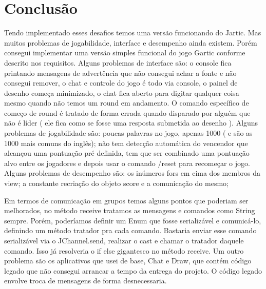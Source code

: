 \documentclass{article}
\begin{document}
\section{Conclusão}
Tendo implementado esses desafios temos uma versão funcionando do Jartic. Mas muitos problemas de jogabilidade, interface e desempenho ainda existem. Porém consegui implementar uma versão simples funcional do jogo Gartic conforme descrito nos requisitos. Alguns problemas de interface são: o console fica printando mensagens de advertência que não consegui achar a fonte e não consegui remover, o chat e controle do jogo é todo via console, o painel de desenho começa minimizado,  o chat fica aberto para digitar qualquer coisa mesmo quando não temos um round em andamento. O comando específico de começo de round é tratado de forma errada quando disparado por alguém que não é líder ( ele fica como se fosse uma resposta submetida ao desenho ). Alguns problemas de jogabilidade são: poucas palavras no jogo, apenas 1000 ( e são as 1000 mais comuns do inglês); não tem detecção automática do vencendor que alcançou uma pontuação pré definida, tem que ser combinado uma pontuação alvo entre os jogadores e depois usar o comando /reset para recomeçar o jogo. Alguns problemas de desempenho são: os inúmeros fors em cima dos membros da view; a constante recriação do objeto score e a comunicação do mesmo;


Em termos de comunicação em grupos temos alguns pontos que poderiam ser melhorados, no método receive tratamos as mensagens e comandos como String sempre. Porém, poderíamos definir um Enum que fosse serializável e comunicá-lo, definindo um método tratador pra cada comando. Bastaria enviar esse comando serializável via o JChannel.send, realizar o cast e chamar o tratador daquele comando. Isso já resolveria o if else gigantesco no método receive. Um outro problema são os aplicativos que usei de base, Chat e Draw, que contém código legado que não consegui arrancar a tempo da entrega do projeto. O código legado envolve troca de mensagens de forma desnecessaria.
\end{document}
